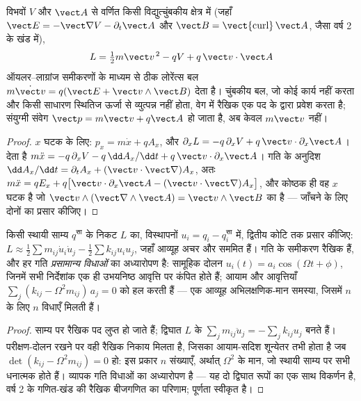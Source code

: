 \begin{proposition}[आवेशित कण का लाग्रांजियन]\label{prop:b3:lagrangian-mechanics:charge}
विभवों $V$ और
$\vect A$ से वर्णित किसी विद्युत्चुंबकीय क्षेत्र में (जहाँ
$\vect E = -\vect\nabla V - \partial_t\vect A$ और
$\vect B = \operatorname{\vect{curl}}\vect A$, जैसा वर्ष 2 के
खंड में), 
\[
L = \tfrac12 m\vect v^{\,2} - qV + q\,\vect v\cdot\vect A
\]
ऑयलर--लाग्रांज समीकरणों के माध्यम से ठीक लोरेंत्स बल
$m\dot{\vect v} = q(\vect E + \vect v\wedge\vect B)$ देता है। चुंबकीय
बल, जो कोई कार्य नहीं करता और किसी साधारण स्थितिज ऊर्जा से व्युत्पन्न
नहीं होता, वेग में रैखिक एक पद के द्वारा प्रवेश करता है; संयुग्मी संवेग
$\vect p = m\vect v + q\vect A$ हो जाता है, अब केवल
$m\vect v$ नहीं।
\end{proposition}

\begin{proof}
$x$ घटक के लिए: $p_x = m\dot x + qA_x$, और
$\partial_xL = -q\,\partial_xV + q\,\vect v\cdot\partial_x\vect A$।
 देता है $m\ddot x = -q\,\partial_xV -
q\,\dd A_x/\dd t + q\,\vect v\cdot\partial_x\vect A$। गति के अनुदिश
$\dd A_x/\dd t = \partial_tA_x + (\vect v\cdot\vect\nabla)A_x$, अतः
$m\ddot x = qE_x + q\big[\vect v\cdot\partial_x\vect A - (\vect v\cdot
\vect\nabla)A_x\big]$, और कोष्ठक ही वह $x$ घटक है जो $\vect
v\wedge(\vect\nabla\wedge\vect A) = \vect v\wedge\vect B$ का है ---
जाँचने के लिए दोनों का प्रसार कीजिए।
\end{proof}

\begin{proposition}[लघु दोलन और प्रसामान्य विधाएँ]\label{prop:b3:lagrangian-mechanics:modes}
किसी स्थायी साम्य $q^{\text{सा}}$ के निकट $L$ का, विस्थापनों
$u_i = q_i - q_i^{\text{सा}}$ में, द्वितीय कोटि तक प्रसार कीजिए:
$L \approx \tfrac12\sum m_{ij}\dot u_i\dot u_j -
\tfrac12\sum k_{ij}u_iu_j$, जहाँ आव्यूह अचर और सममित हैं। गति के
समीकरण रैखिक हैं, और हर गति \emph{प्रसामान्य विधाओं} का अध्यारोपण है:
सामूहिक दोलन $u_i(t) = a_i\cos(\Omega t
+ \phi)$, जिनमें सभी निर्देशांक एक ही उभयनिष्ठ आवृत्ति पर कंपित होते
हैं; आयाम और आवृत्तियाँ $\sum_j(k_{ij} -
\Omega^2m_{ij})\,a_j = 0$ को हल करती हैं --- एक आव्यूह
अभिलक्षणिक-मान समस्या, जिसमें $n$
 के लिए $n$ विधाएँ मिलती हैं।
\end{proposition}

\begin{proof}
साम्य पर रैखिक पद लुप्त हो जाते हैं; द्विघात $L$ के  $\sum_jm_{ij}\ddot u_j = -\sum_jk_{ij}u_j$ बनते हैं।
परीक्षण-दोलन रखने पर वही रैखिक निकाय मिलता है, जिसका आयाम-सदिश
शून्येतर तभी होता है जब $\det(k_{ij} -
\Omega^2m_{ij}) = 0$ हो: इस प्रकार $n$ संख्याएँ, अर्थात् $\Omega^2$ के
मान, जो स्थायी साम्य पर सभी धनात्मक होते हैं। व्यापक गति विधाओं का
अध्यारोपण है --- यह दो द्विघात रूपों का एक साथ विकर्णन है, वर्ष 2 के
गणित-खंड की रैखिक बीजगणित का परिणाम; पूर्णता स्वीकृत है।
\end{proof}


